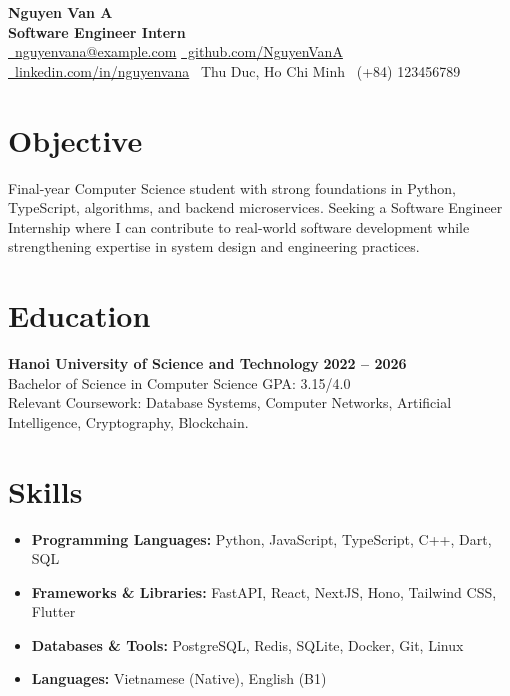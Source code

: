 \documentclass[10pt, letterpaper]{article}
\begin{document}
\begin{center}
    {\huge \textbf{Nguyen Van A}} \\ \vspace{4pt}
    {\Large \textbf{Software Engineer Intern}} \\ \vspace{6pt}
    \small
    \href{mailto:nguyenvana@example.com}{\faEnvelope\ nguyenvana@example.com} \quad
    \href{https://github.com/NguyenVanA}{\faGithub\ github.com/NguyenVanA} \quad
    \href{https://www.linkedin.com/in/nguyenvana/}{\faLinkedin\ linkedin.com/in/nguyenvana} \quad
    \faMapMarker\ Thu Duc, Ho Chi Minh \quad
    \faPhone\ (+84) 123456789
\end{center}

\section*{Objective}
Final-year Computer Science student with strong foundations in Python, TypeScript, algorithms, and backend microservices. Seeking a Software Engineer Internship where I can contribute to real-world software development while strengthening expertise in system design and engineering practices.

\section*{Education}
\textbf{Hanoi University of Science and Technology} \hfill \textbf{2022 -- 2026} \\
Bachelor of Science in Computer Science \hfill GPA: 3.15/4.0 \\
Relevant Coursework: Database Systems, Computer Networks, Artificial Intelligence, Cryptography, Blockchain.

\section*{Skills}
\begin{itemize}[leftmargin=*, noitemsep, topsep=0pt]
    \item \textbf{Programming Languages:} Python, JavaScript, TypeScript, C++, Dart, SQL
    \item \textbf{Frameworks \& Libraries:} FastAPI, React, NextJS, Hono, Tailwind CSS, Flutter
    \item \textbf{Databases \& Tools:} PostgreSQL, Redis, SQLite, Docker, Git, Linux
    \item \textbf{Languages:} Vietnamese (Native), English (B1)
\end{itemize}
\end{document}
